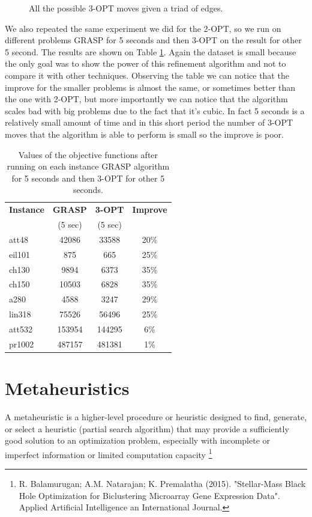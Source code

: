 \begin{figure}[h!]
\begin{subfigure}[b]{0.24\linewidth}
    \caption{}
  \end{subfigure}
  \caption{All the possible 3-OPT moves given a triad of edges.}
  \label{fig:threeopt}
\end{figure}
 
\noindent We also repeated the same experiment we did for the 2-OPT, so we run on different problems GRASP for 5 seconds and then 3-OPT on the result for other 5 second. The results are shown on Table \ref{tab:threeopt}. Again the dataset is small because the only goal was to show the power of this refinement algorithm and not to compare it with other techniques. Observing the table we can notice that the improve for the smaller problems is almost the same, or sometimes better than the one with 2-OPT, but more importantly we can notice that the algorithm scales bad with big problems due to the fact that it's cubic. In fact 5 seconds is a relatively small amount of time and in this short period the number of 3-OPT moves that the algorithm is able to perform is small so the improve is poor.

\begin{table}[h!]
	\begin{center}
		\begin{tabular}{l|c|c|c}
			\textbf{Instance} & \textbf{GRASP} & \textbf{3-OPT} & \textbf{Improve}	\\
			& (5 sec) & (5 sec) & \\
			\hline
			att48 & 42086 & 33588 & 20\% \\
			eil101 & 875 & 665 & 25\% \\
			ch130 & 9894 & 6373 & 35\% \\
			ch150 & 10503 & 6828 & 35\% \\
			a280 & 4588 & 3247 & 29\% \\
			lin318 & 75526 & 56496 & 25\% \\ 
			att532 & 153954 & 144295 & 6\% \\	
			pr1002 & 487157 & 481381 & 1\% \\
		\end{tabular}
		\caption{Values of the objective functions after running on each instance GRASP algorithm for 5 seconds and then 3-OPT for other 5 seconds.}
		\label{tab:threeopt}
	\end{center}
\end{table}

\newpage

\section{Metaheuristics}
A metaheuristic is a higher-level procedure or heuristic designed to find, generate, or select a heuristic (partial search algorithm) that may provide a sufficiently good solution to an optimization problem, especially with incomplete or imperfect information or limited computation capacity \footnote{R. Balamurugan; A.M. Natarajan; K. Premalatha (2015). "Stellar-Mass Black Hole Optimization for Biclustering Microarray Gene Expression Data". Applied Artificial Intelligence an International Journal.}


